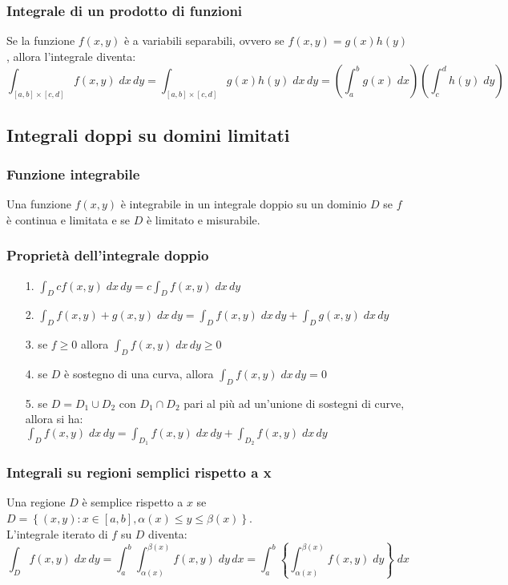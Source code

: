 \documentclass[a4paper]{article}
\begin{document}
\subsubsection*{Integrale di un prodotto di funzioni}
Se la funzione \(f(x,y)\) è a variabili separabili, ovvero se \(f(x,y) = g(x)h(y)\), allora l'integrale diventa:
\[\int_{[a,b] \times [c,d]} f(x,y) \; dx \, dy = \int_{[a,b] \times [c,d]} g(x) h(y) \; dx \, dy = \left(\int_{a}^{b} g(x) \; dx\right) \left(\int_{c}^{d} h(y) \; dy\right)\]

\newpage

\subsection{Integrali doppi su domini limitati}
\subsubsection*{Funzione integrabile}
Una funzione \(f(x,y)\) è integrabile in un integrale doppio su un dominio \(D\) se \(f\) è continua e limitata e se \(D\) è 
limitato e misurabile.

\subsubsection*{Proprietà dell'integrale doppio}
\begin{itemize}
	\item[1.] \(\displaystyle \int_D c f(x,y) \; dx \, dy = c \int_D f(x,y) \; dx \, dy\)
	\item[2.] \(\displaystyle \int_D f(x,y) + g(x,y) \; dx \, dy = \int_D f(x,y) \; dx \, dy + \int_D g(x,y) \; dx \, dy\)
	\item[3.] se \(f \geq 0\) allora \(\displaystyle \int_D f(x,y) \; dx \, dy \geq 0\)
	\item[4.] se \(D\) è sostegno di una curva, allora \(\displaystyle \int_D f(x,y) \; dx \, dy = 0\)
	\item[5.] se \(D = D_1 \cup D_2\) con \(D_1 \cap D_2\) pari al più ad un'unione di sostegni di curve, allora si ha: \\
	\(\displaystyle \int_D f(x,y) \; dx \, dy = \int_{D_1} f(x,y) \; dx \, dy + \int_{D_2} f(x,y) \; dx \, dy\)
\end{itemize}

\subsubsection*{Integrali su regioni semplici rispetto a x}
Una regione \(D\) è semplice rispetto a \(x\) se \(D = \left\{ (x,y) : x \in [a,b], \alpha(x) \leq y \leq \beta(x) \right\}\). \\
L'integrale iterato di \(f\) su \(D\) diventa:
\[\int_D f(x,y) \; dx \, dy = \int_a^b \int_{\alpha(x)}^{\beta(x)} f(x,y) \; dy \, dx = \int_a^b \left\{\int_{\alpha(x)}^{\beta(x)} f(x,y) \; dy\right\} \; dx\]
\end{document}
